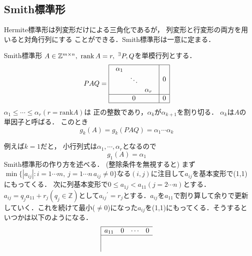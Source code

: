\subsection{Smith標準形}
Hermite標準形は列変形だけによる三角化であるが，
列変形と行変形の両方を用いると対角行列にする
ことができる．Smith標準形は一意に定まる．
\begin{itembox}[l]{Smith標準形}
$A\in{\mathbb{Z}}^{m\times n},\ \rank{A}=r,\ {}^{\exists}P,Q$を単模行列とする．
\begin{equation}
  PAQ=
  \begin{array}{|c|c|}
    \hline
    \begin{array}{ccc}
      {\alpha}_1&&\\
      &\ddots&\\
      &&{\alpha}_r
    \end{array}&0\\\hline
    0&0\\\hline
  \end{array}
\end{equation}
$\alpha_1\leq \cdots \leq \alpha_r(r =\mathrm{rank} A)$は
正の整数であり，$\alpha_k$が$\alpha_{k+1}$を割り切る．
$\alpha_k$は$A$の単因子と呼ばる．
このとき
\begin{equation}
    g_k (A)=g_k (PAQ)={\alpha}_1 \cdots{\alpha}_k
\end{equation}
\end{itembox}
例えば$k=1$だと，
小行列式は$\alpha_1,\cdots, \alpha_r$となるので
\begin{equation}
    g_1 (A) = \alpha_1
\end{equation}
Smith標準形の作り方を述べる．
(整除条件を無視すると)
まず$\min\{ |a_{ij}|:i=1\cdots m,\ j=1\cdots n\, a_{ij}\neq 0\}$なる$(i,j)$に注目して$a_{ij}$を基本変形で(1,1)にもってくる．
次に列基本変形で$0\leq a_{1j}<a_{11} (j=2\cdots n)$とする．$a_{ij}=q_j a_{11}+r_j (q_j \in\mathbb{Z})$として${a_{ij}}^{'}=r_j$とする．$a_{ij}$を$a_{11}$で割り算して余りで更新していく．これを続けて最小($\neq 0$)になった$a_{ij}$を(1,1)にもってくる．そうするといつかは以下のようになる．
\begin{equation}
  \begin{array}{|cccc}
    \hline
    a_{11}&0&\cdots&0\\\hline
    &&&\\
    &&&
  \end{array}
\end{equation}

